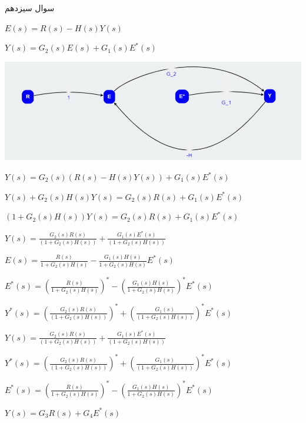 \documentclass{article}
\begin{document}
\begin{problem}{سوال سیزدهم}
	\raggedleft
	
	$E(s) =R(s) - H(s)Y(s)$
	
	$Y(s) = G_2(s)E(s) + G_1(s)E^*(s)$
	
	
	\includegraphics[width=\linewidth,]{Second Series/12.png}
	
	
	$Y(s) = G_2(s)(R(s) - H(s)Y(s)) + G_1(s)E^*(s)$
	
	$Y(s) +  G_2(s)H(s)Y(s) = G_2(s)R(s) + G_1(s)E^*(s)$
	
	$(1 + G_2(s)H(s))Y(s) = G_2(s)R(s) + G_1(s)E^*(s)$
	
	$Y(s) = \frac{G_2(s)R(s)}{(1 + G_2(s)H(s))} + \frac{G_1(s)E^*(s)}{(1 + G_2(s)H(s))}$
	
	$E(s) = \frac{R(s)}{1 + G_2(s)H(s)} - \frac{G_1(s)H(s)}{1 + G_2(s)H(s)} E^*(s)$
	
	$E^*(s) = (\frac{R(s)}{1 + G_2(s)H(s)})^* - (\frac{G_1(s)H(s)}{1 + G_2(s)H(s)})^* E^*(s)$
	
	
	$Y^*(s) = (\frac{G_2(s)R(s)}{(1 + G_2(s)H(s))})^* + (\frac{G_1(s)}{(1 + G_2(s)H(s))})^* E^*(s)$
	
	
	
	$Y(s) = \frac{G_2(s)R(s)}{(1 + G_2(s)H(s))} + \frac{G_1(s)E^*(s)}{(1 + G_2(s)H(s))}$
	
	
	$Y^*(s) = (\frac{G_2(s)R(s)}{(1 + G_2(s)H(s))})^* + (\frac{G_1(s)}{(1 + G_2(s)H(s))})^* E^*(s)$
	
	$E^*(s) = (\frac{R(s)}{1 + G_2(s)H(s)})^* - (\frac{G_1(s)H(s)}{1 + G_2(s)H(s)})^* E^*(s)$
	
	
	
	$Y(s) = G_3 R(s) + G_4 E^*(s)$
	

\end{problem}
\end{document}
